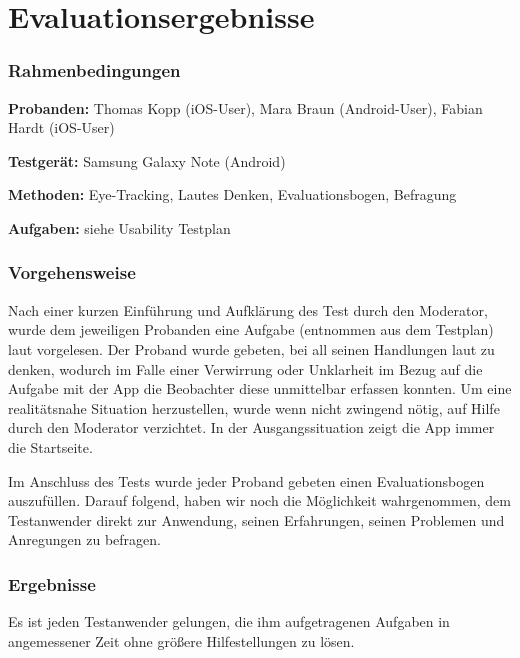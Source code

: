 \section{Evaluationsergebnisse}

\subsubsection*{Rahmenbedingungen}
\textbf{Probanden:} Thomas Kopp (iOS-User), Mara Braun (Android-User), Fabian Hardt (iOS-User)

\textbf{Testgerät:} Samsung Galaxy Note (Android)

\textbf{Methoden:} Eye-Tracking, Lautes Denken, Evaluationsbogen, Befragung

\textbf{Aufgaben:} siehe Usability Testplan

\subsubsection*{Vorgehensweise}

Nach einer kurzen Einführung und Aufklärung des Test durch den Moderator, wurde dem jeweiligen Probanden eine Aufgabe (entnommen aus dem Testplan) laut vorgelesen. Der Proband wurde gebeten, bei all seinen Handlungen laut zu denken, wodurch im Falle einer Verwirrung oder Unklarheit im Bezug auf die Aufgabe mit der App die Beobachter diese unmittelbar erfassen konnten. Um eine realitätsnahe Situation herzustellen, wurde wenn nicht zwingend nötig, auf Hilfe durch den Moderator verzichtet. In der Ausgangssituation zeigt die App immer die Startseite.

Im Anschluss des Tests wurde jeder Proband gebeten einen Evaluationsbogen auszufüllen. Darauf folgend, haben wir noch die Möglichkeit wahrgenommen, dem Testanwender direkt zur Anwendung, seinen Erfahrungen, seinen Problemen und Anregungen zu befragen.

\subsubsection*{Ergebnisse}

Es ist jeden Testanwender gelungen, die ihm aufgetragenen Aufgaben in angemessener Zeit ohne größere Hilfestellungen zu lösen.

